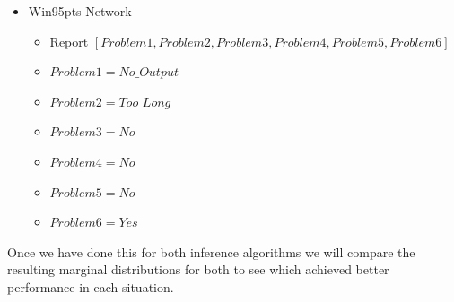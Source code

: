 \documentclass{article}
\begin{document}
\begin{itemize}
    \item Win95pts Network 
        \begin{itemize} 
            \item Report $[Problem1, Problem2, Problem3, Problem4, Problem5, Problem6]$
            \item $Problem1=No\_Output$
            \item $Problem2=Too\_Long$
            \item $Problem3=No$
            \item $Problem4=No$
            \item $Problem5=No$
            \item $Problem6=Yes$
        \end{itemize}
\end{itemize}
Once we have done this for both inference algorithms we will compare the resulting marginal distributions for both to see which achieved better performance in each situation. 
\end{document}
